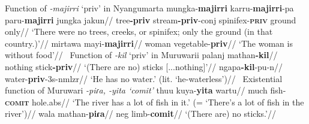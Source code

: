 \pex Function of \textit{-majirri} `\gls{priv}' in Nyangumarta
\a\begingl\gla mungka-\textbf{majirri} karru-\textbf{majirri}-pa paru-\textbf{majirri} jungka jakun//
\glb tree\textbf{-\gls{priv}} stream\textbf{-\gls{priv}}-\gls{conj} spinifex\textsc{-\textbf{priv}} ground only//
\glft`There were no trees, creeks, or spinifex; only the ground (in that country.)'//\endgl
\a\begingl\gla mirtawa mayi-\textbf{majirri}//
\glb woman vegetable-\textbf{\gls{priv}}//
\glft`The woman is without food'//\endgl\xe
\pex~Function of \textit{-kil} `\gls{priv}' in Muruwarii
\a\begingl\gla palanj mathan\textbf{-kil}//
\glb nothing stick\textbf{-\gls{priv}}//
\glft`(There are no) sticks [...nothing]'//\endgl
{}
\a\begingl\gla ngapa\textbf{-kil}-pu-n//
\glb water-\textbf{\gls{priv}}-3\gls{s}-\gls{nmlzr}//
\glft`He has no water.' (lit. `he-waterless')// \endgl
 \xe
\pex~Existential function of Muruwari \textit{-piɾa, -yita `\gls{comit}'} 
\a\begingl%
	\gla thuu kuya-\textbf{yita} wartu//
	\glb much fish-\textsc{\textbf{comit}} hole.\gls{abs}//
	\glft`The river has a lot of fish in it.' (= `There's a lot of fish in the river')//\endgl
	\a\begingl\gla wala mathan-\textbf{piɾa}//
	\glb \gls{neg} limb-\textbf{\gls{comit}}//
	\glft`(There are) no sticks.'//\endgl
\xe





